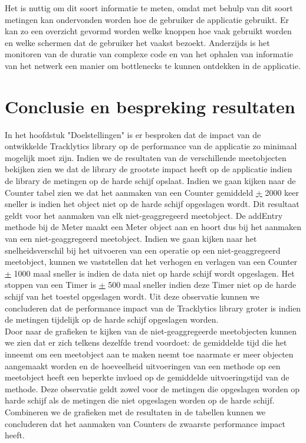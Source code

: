 Het is nuttig om dit soort informatie te meten, omdat met behulp van dit soort metingen kan ondervonden worden hoe de gebruiker de applicatie gebruikt. Er kan zo een overzicht gevormd worden welke knoppen hoe vaak gebruikt worden en welke schermen dat de gebruiker het vaakst bezoekt. Anderzijds is het monitoren van de duratie van complexe code en van het ophalen van informatie van het netwerk een manier om bottlenecks te kunnen ontdekken in de applicatie. 

\section{Conclusie en bespreking resultaten}\label{Section:Conclusie}
In het hoofdstuk "Doelstellingen" is er besproken dat de impact van de ontwikkelde Tracklytics library op de performance van de applicatie zo minimaal mogelijk moet zijn. Indien we de resultaten van de verschillende meetobjecten bekijken zien we dat de library de grootste impact heeft op de applicatie indien de library de metingen op de harde schijf opslaat. Indien we gaan kijken naar de Counter tabel zien we dat het aanmaken van een Counter gemiddeld \underline{+} 2000 keer sneller is indien het object niet op de harde schijf opgeslagen wordt. Dit resultaat geldt voor het aanmaken van elk niet-geaggregeerd meetobject. De addEntry methode bij de Meter maakt een Meter object aan en hoort dus bij het aanmaken van een niet-geaggregeerd meetobject. Indien we gaan kijken naar het snelheidsverschil bij het uitvoeren van een operatie op een niet-geaggregeerd meetobject, kunnen we vaststellen dat het verhogen en verlagen van een Counter \underline{+} 1000 maal sneller is indien de data niet op harde schijf wordt opgeslagen. Het stoppen van een Timer is \underline{+} 500 maal sneller indien deze Timer niet op de harde schijf van het toestel opgeslagen wordt. Uit deze observatie kunnen we concluderen dat de performance impact van de Tracklytics library groter is indien de metingen tijdelijk op de harde schijf opgeslagen worden. \\

Door naar de grafieken te kijken van de niet-geaggregeerde meetobjecten kunnen we zien dat er zich telkens dezelfde trend voordoet: de gemiddelde tijd die het inneemt om een meetobject aan te maken neemt toe naarmate er meer objecten aangemaakt worden en de hoeveelheid uitvoeringen van een methode op een meetobject heeft een beperkte invloed op de gemiddelde uitvoeringstijd van de methode. Deze observatie geldt zowel voor de metingen die opgeslagen worden op harde schijf als de metingen die niet opgeslagen worden op de harde schijf. Combineren we de grafieken met de resultaten in de tabellen kunnen we concluderen dat het aanmaken van Counters de zwaarste performance impact heeft. \\


